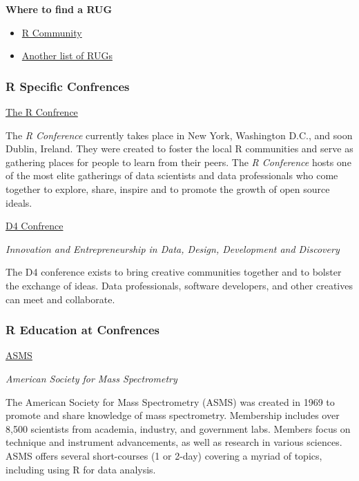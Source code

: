 \documentclass[
]{book}
\begin{document}
\textbf{Where to find a RUG}

\begin{itemize}
\item
  \href{https://r-community.org/usergroups/}{R Community}
\item
  \href{https://jumpingrivers.github.io/meetingsR/r-user-groups.html}{Another list of RUGs}\\
\end{itemize}

\hypertarget{r-specific-confrences}{%
\subsubsection*{R Specific Confrences}\label{r-specific-confrences}}

\href{https://rstats.ai/gov}{The R Confrence}

The \emph{R Conference} currently takes place in New York, Washington D.C., and soon Dublin, Ireland. They were created to foster the local R communities and serve as gathering places for people to learn from their peers. The \emph{R Conference} hosts one of the most elite gatherings of data scientists and data professionals who come together to explore, share, inspire and to promote the growth of open source ideals.

\href{https://d4con.io/}{D4 Confrence}

\emph{Innovation and Entrepreneurship in Data, Design, Development and Discovery}

The D4 conference exists to bring creative communities together and to bolster the exchange of ideas. Data professionals, software developers, and other creatives can meet and collaborate.

\hypertarget{r-education-at-confrences}{%
\subsubsection*{R Education at Confrences}\label{r-education-at-confrences}}

\href{https://ASMS.org/}{ASMS}

\emph{American Society for Mass Spectrometry}

The American Society for Mass Spectrometry (ASMS) was created in 1969 to promote and share knowledge of mass spectrometry. Membership includes over 8,500 scientists from academia, industry, and government labs. Members focus on technique and instrument advancements, as well as research in various sciences. ASMS offers several short-courses (1 or 2-day) covering a myriad of topics, including using R for data analysis.
\end{document}

